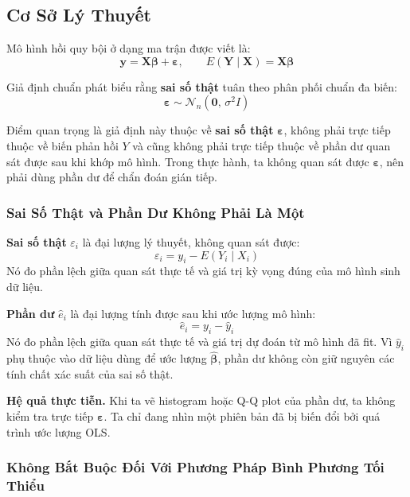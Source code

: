 \subsection{Cơ Sở Lý Thuyết}

Mô hình hồi quy bội ở dạng ma trận được viết là:
\[
  \mathbf{y} = \mathbf{X}\boldsymbol{\beta} + \boldsymbol{\varepsilon},
  \qquad
  E(\mathbf{Y} \mid \mathbf{X}) = \mathbf{X}\boldsymbol{\beta}
\]

Giả định chuẩn phát biểu rằng \textbf{sai số thật} tuân theo phân phối chuẩn đa biến:
\[
  \boldsymbol{\varepsilon} \sim \mathcal{N}_n(\mathbf{0},\, \sigma^2 I)
\]

Điểm quan trọng là giả định này thuộc về \textbf{sai số thật} $\boldsymbol{\varepsilon}$, không phải trực tiếp thuộc về biến phản hồi $Y$ và cũng không phải trực tiếp thuộc về phần dư quan sát được sau khi khớp mô hình. Trong thực hành, ta không quan sát được $\boldsymbol{\varepsilon}$, nên phải dùng phần dư để chẩn đoán gián tiếp.

\subsubsection{Sai Số Thật và Phần Dư Không Phải Là Một}

\textbf{Sai số thật} $\varepsilon_i$ là đại lượng lý thuyết, không quan sát được:
\[
  \varepsilon_i = y_i - E(Y_i \mid X_i)
\]
Nó đo phần lệch giữa quan sát thực tế và giá trị kỳ vọng đúng của mô hình sinh dữ liệu.

\textbf{Phần dư} $\hat e_i$ là đại lượng tính được sau khi ước lượng mô hình:
\[
  \hat e_i = y_i - \hat y_i
\]
Nó đo phần lệch giữa quan sát thực tế và giá trị dự đoán từ mô hình đã fit. Vì $\hat y_i$ phụ thuộc vào dữ liệu dùng để ước lượng $\hat{\boldsymbol{\beta}}$, phần dư không còn giữ nguyên các tính chất xác suất của sai số thật.

\textbf{Hệ quả thực tiễn.} Khi ta vẽ histogram hoặc Q-Q plot của phần dư, ta không kiểm tra trực tiếp $\boldsymbol{\varepsilon}$. Ta chỉ đang nhìn một phiên bản đã bị biến đổi bởi quá trình ước lượng OLS.

\subsubsection{Không Bắt Buộc Đối Với Phương Pháp Bình Phương Tối Thiểu}

